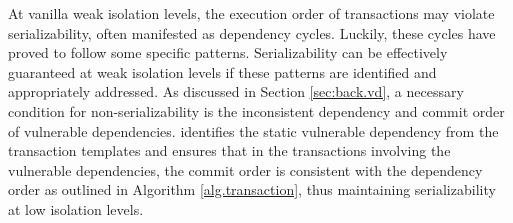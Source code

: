 At vanilla weak isolation levels, the execution order of transactions may violate serializability, often manifested as dependency cycles. Luckily, these cycles have proved to follow some specific patterns. Serializability can be effectively guaranteed at weak isolation levels if these patterns are identified and appropriately addressed. As discussed in Section \ref{sec:back.vd}, a necessary condition for non-serializability is the inconsistent dependency and commit order of vulnerable dependencies. \sysname identifies the static vulnerable dependency from the transaction templates and ensures that in the transactions involving the vulnerable dependencies, the commit order is consistent with the dependency order as outlined in Algorithm \ref{alg.transaction}, thus maintaining serializability at low isolation levels. 





